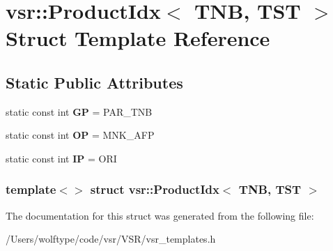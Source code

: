 \hypertarget{structvsr_1_1_product_idx_3_01_t_n_b_00_01_t_s_t_01_4}{\section{vsr\-:\-:Product\-Idx$<$ T\-N\-B, T\-S\-T $>$ Struct Template Reference}
\label{structvsr_1_1_product_idx_3_01_t_n_b_00_01_t_s_t_01_4}
}
\subsection*{Static Public Attributes}
\begin{DoxyCompactItemize}
\item 
\hypertarget{structvsr_1_1_product_idx_3_01_t_n_b_00_01_t_s_t_01_4_a90bec997f2e752e2e0150c31cc1f562b}{static const int {\bfseries G\-P} = P\-A\-R\-\_\-\-T\-N\-B}\label{structvsr_1_1_product_idx_3_01_t_n_b_00_01_t_s_t_01_4_a90bec997f2e752e2e0150c31cc1f562b}

\item 
\hypertarget{structvsr_1_1_product_idx_3_01_t_n_b_00_01_t_s_t_01_4_a71261878fde3c16a4fe9465b755007dd}{static const int {\bfseries O\-P} = M\-N\-K\-\_\-\-A\-F\-P}\label{structvsr_1_1_product_idx_3_01_t_n_b_00_01_t_s_t_01_4_a71261878fde3c16a4fe9465b755007dd}

\item 
\hypertarget{structvsr_1_1_product_idx_3_01_t_n_b_00_01_t_s_t_01_4_ad7acf481255b130b571443e0e395e4d0}{static const int {\bfseries I\-P} = O\-R\-I}\label{structvsr_1_1_product_idx_3_01_t_n_b_00_01_t_s_t_01_4_ad7acf481255b130b571443e0e395e4d0}

\end{DoxyCompactItemize}
\subsubsection*{template$<$$>$ struct vsr\-::\-Product\-Idx$<$ T\-N\-B, T\-S\-T $>$}



The documentation for this struct was generated from the following file\-:\begin{DoxyCompactItemize}
\item 
/\-Users/wolftype/code/vsr/\-V\-S\-R/vsr\-\_\-templates.\-h\end{DoxyCompactItemize}
